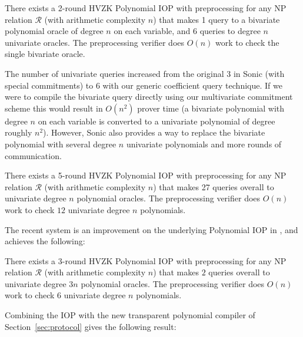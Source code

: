 \begin{theorem}
There exists a 2-round HVZK Polynomial IOP with preprocessing for any NP relation $\mathcal{R}$ (with arithmetic complexity $n$) that makes 1 query to a bivariate polynomial oracle of degree $n$ on each variable, and 6 queries to degree $n$ univariate oracles. The preprocessing verifier does $O(n)$ work to check the single bivariate oracle. 
\end{theorem}

The number of univariate queries increased from the original $3$ in \textsf{Sonic} (with special commitments) to $6$ with our generic coefficient query technique. 
If we were to compile the bivariate query directly using our multivariate commitment scheme this would result in $O(n^2)$ prover time (a bivariate polynomial with degree $n$ on each variable is converted to a univariate polynomial of degree roughly $n^2$). However, \textsf{Sonic} also provides a way to replace the bivariate polynomial with several degree $n$ univariate polynomials and more rounds of communication. 

\begin{theorem}\label{thm:sonic} 
There exists a 5-round HVZK Polynomial IOP with preprocessing for any NP relation $\mathcal{R}$ (with arithmetic complexity $n$) that makes 27 queries overall to univariate degree $n$ polynomial oracles. The preprocessing verifier does $O(n)$ work to check $12$ univariate degree $n$ polynomials. 
\end{theorem}

The recent system  is an improvement on the underlying Polynomial IOP in , and achieves the following: 

\begin{theorem} 
There exists a 3-round HVZK Polynomial IOP with preprocessing for any NP relation $\mathcal{R}$ (with arithmetic complexity $n$) that makes $2$ queries overall to univariate degree $3n$ polynomial oracles. The preprocessing verifier does $O(n)$ work to check $6$ univariate degree $n$ polynomials.
\end{theorem}

Combining the  IOP with the new transparent polynomial compiler of Section~\ref{sec:protocol} gives the following result:  

